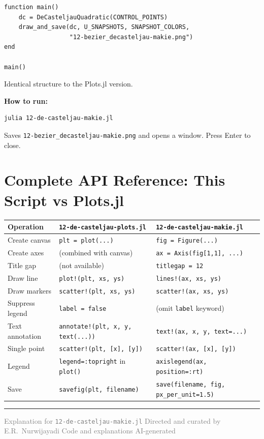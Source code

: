 \documentclass[12pt, a4paper]{article}
\newcommand{\cd}[1]{\texttt{#1}}
\begin{document}
\begin{verbatim}
function main()
    dc = DeCasteljauQuadratic(CONTROL_POINTS)
    draw_and_save(dc, U_SNAPSHOTS, SNAPSHOT_COLORS,
                  "12-bezier_decasteljau-makie.png")
end

main()
\end{verbatim}

Identical structure to the Plots.jl version.

\begin{notebox}
\textbf{How to run:}
\begin{verbatim}
julia 12-de-casteljau-makie.jl
\end{verbatim}
Saves \cd{12-bezier\_decasteljau-makie.png} and opens a window.
Press Enter to close.
\end{notebox}


\section{Complete API Reference: This Script vs Plots.jl}

\begin{center}
\begin{tabular}{p{3.5cm}p{4.8cm}p{4.8cm}}
\toprule
Operation & \cd{12-de-casteljau-plots.jl} & \cd{12-de-casteljau-makie.jl} \\
\midrule
Create canvas &
  \cd{plt = plot(...)} &
  \cd{fig = Figure(...)} \\[4pt]
Create axes &
  (combined with canvas) &
  \cd{ax = Axis(fig[1,1], ...)} \\[4pt]
Title gap &
  (not available) &
  \cd{titlegap = 12} \\[4pt]
Draw line &
  \cd{plot!(plt, xs, ys)} &
  \cd{lines!(ax, xs, ys)} \\[4pt]
Draw markers &
  \cd{scatter!(plt, xs, ys)} &
  \cd{scatter!(ax, xs, ys)} \\[4pt]
Suppress legend &
  \cd{label = false} &
  (omit \cd{label} keyword) \\[4pt]
Text annotation &
  \cd{annotate!(plt, x, y, text(...))} &
  \cd{text!(ax, x, y, text=...)} \\[4pt]
Single point &
  \cd{scatter!(plt, [x], [y])} &
  \cd{scatter!(ax, [x], [y])} \\[4pt]
Legend &
  \cd{legend=:topright} in \cd{plot()} &
  \cd{axislegend(ax, position=:rt)} \\[4pt]
Save &
  \cd{savefig(plt, filename)} &
  \cd{save(filename, fig, px\_per\_unit=1.5)} \\
\bottomrule
\end{tabular}
\end{center}

\vspace{2em}\hrule\vspace{0.5em}
{\small\textcolor{gray}{%
Explanation for \texttt{12-de-casteljau-makie.jl}
\textbar{} Directed and curated by E.R.\ Nurwijayadi
\textbar{} Code and explanations AI-generated}}
\end{document}
